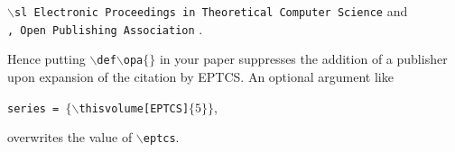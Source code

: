 \documentclass[submission,copyright,creativecommons]{eptcs}
\begin{document}
\noindent
{\small \tt $\backslash$sl Electronic Proceedings in Theoretical Computer Science} \hfill and\\
{\small \tt , Open Publishing Association} \hfill .

\noindent
Hence putting {\small \tt $\backslash$def$\backslash$opa$\{\}$} in
your paper suppresses the addition of a publisher upon expansion of the citation by EPTCS\@.
An optional argument like
\begin{center}
  {\tt series    = $\{\backslash$thisvolume[EPTCS]$\{5\}\}$},
\end{center}
overwrites the value of {\tt \small $\backslash$eptcs}.

\nocite{*}


\end{document}
